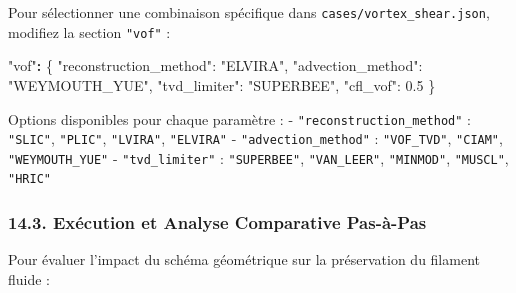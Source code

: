 \documentclass[
  french,
]{article}
\newenvironment{Shaded}{}{}
\newcommand{\DataTypeTok}[1]{\textcolor[rgb]{0.56,0.13,0.00}{#1}}
\newcommand{\ErrorTok}[1]{\textcolor[rgb]{1.00,0.00,0.00}{\textbf{#1}}}
\newcommand{\FloatTok}[1]{\textcolor[rgb]{0.25,0.63,0.44}{#1}}
\newcommand{\FunctionTok}[1]{\textcolor[rgb]{0.02,0.16,0.49}{#1}}
\newcommand{\StringTok}[1]{\textcolor[rgb]{0.25,0.44,0.63}{#1}}
\begin{document}
Pour sélectionner une combinaison spécifique dans
\texttt{cases/vortex\_shear.json}, modifiez la section \texttt{"vof"} :

\begin{Shaded}
\begin{Highlighting}[]
\StringTok{"vof"}\ErrorTok{:} \FunctionTok{\{}
  \DataTypeTok{"reconstruction\_method"}\FunctionTok{:} \StringTok{"ELVIRA"}\FunctionTok{,}
  \DataTypeTok{"advection\_method"}\FunctionTok{:} \StringTok{"WEYMOUTH\_YUE"}\FunctionTok{,}
  \DataTypeTok{"tvd\_limiter"}\FunctionTok{:} \StringTok{"SUPERBEE"}\FunctionTok{,}
  \DataTypeTok{"cfl\_vof"}\FunctionTok{:} \FloatTok{0.5}
\FunctionTok{\}}
\end{Highlighting}
\end{Shaded}

Options disponibles pour chaque paramètre : -
\texttt{"reconstruction\_method"} : \texttt{"SLIC"}, \texttt{"PLIC"},
\texttt{"LVIRA"}, \texttt{"ELVIRA"} - \texttt{"advection\_method"} :
\texttt{"VOF\_TVD"}, \texttt{"CIAM"}, \texttt{"WEYMOUTH\_YUE"} -
\texttt{"tvd\_limiter"} : \texttt{"SUPERBEE"}, \texttt{"VAN\_LEER"},
\texttt{"MINMOD"}, \texttt{"MUSCL"}, \texttt{"HRIC"}

\subsubsection{14.3. Exécution et Analyse Comparative
Pas-à-Pas}\label{exuxe9cution-et-analyse-comparative-pas-uxe0-pas}

Pour évaluer l'impact du schéma géométrique sur la préservation du
filament fluide :
\end{document}
